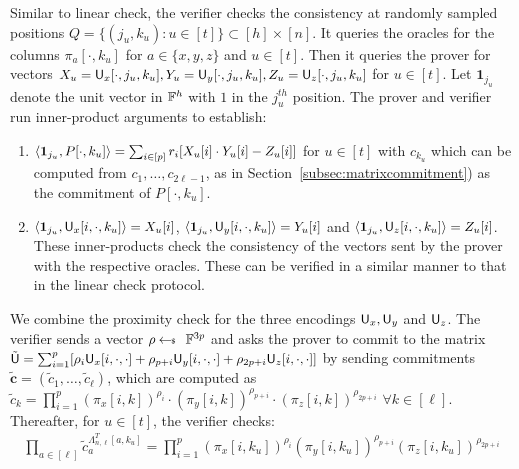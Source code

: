  Similar to linear check, the verifier checks the consistency at randomly sampled positions $Q=\{(j_u,k_u) : u\in[t] \}
\subset [h]\times[n]$. It queries the oracles for the columns $\pi_a[\cdot, k_u]$ for $a\in \{x,y,z\}$ and $u\in [t]$. Then it queries the prover for vectors $X_u = \ewit_x[\cdot,j_u,k_u], Y_u = \ewit_y[\cdot, j_u,k_u], Z_u = \ewit_z[\cdot,j_u,k_u]$ for $u\in [t]$. Let $\bm{1}_{j_u}$ denote the unit vector in $\FF^h$ with $1$ in the $j_u^{th}$ position. The prover and verifier run inner-product arguments to establish: 
\begin{enumerate}[{\rm 1.}]
	\item $\innp{\bm{1}_{j_u}}{P[\cdot,k_u]} = \sum_{i\in[p]} r_i[X_u[i]\cdot Y_u[i] - Z_u[i]]$ for $u\in[t]$ with $c_{k_u}$ which can be computed from $c_1,\ldots,c_{2\ell-1}$, as in Section~\ref{subsec:matrixcommitment})  as the commitment of  $P[\cdot,k_u]$.
	\item $\innp{\bm{1}_{j_u}}{\ewit_x[i,\cdot,k_u]} = X_u[i]$, $\innp{\bm{1}_{j_u}}{\ewit_y[i,\cdot,k_u]}=Y_u[i]$ and $\innp{\bm{1}_{j_u}}{\ewit_z[i,\cdot,k_u]}=Z_u[i]$. These inner-products check the consistency of the vectors sent by the prover with the respective oracles. These can be verified in a similar manner to that in the linear check protocol.
\end{enumerate}
\smallskip
{} We combine the proximity check for the three encodings $\ewit_x,\ewit_y$ and $\ewit_z$. The verifier sends a vector $\rho\sample \FF^{3p}$ and asks the prover to commit to the matrix $\tilde{\ewit}=\sum_{i=1}^p[\rho_i\ewit_x[i,\cdot,\cdot] + \rho_{p+i}\ewit_y[i,\cdot,\cdot]+\rho_{2p+i}\ewit_z[i,\cdot,\cdot]]$
by sending commitments $\tilde{\bm{c}}=(\tilde{c}_1,\ldots,\tilde{c}_\ell)$, which are computed as $\tilde{c}_k = \prod_{i=1}^{p} (\pi_x[i,k])^{\rho_i} \cdot (\pi_y[i,k])^{\rho_{p+i}}\cdot(\pi_z[i,k])^{\rho_{2p+i}}$ $\forall k\in[\ell]$. Thereafter, for $u\in [t]$, the verifier checks: %
\begin{align}\label{eq:combinedproximity}
\prod_{a\in[\ell]} \tilde{c}_a^{\Lambda_{n,\ell}^T[a,k_u]} = \prod_{i=1}^{p} (\pi_x[i,k_u])^{\rho_i} (\pi_y[i,k_u])^{\rho_{p+i}}(\pi_z[i,k_u])^{\rho_{2p+i}}
\end{align}
